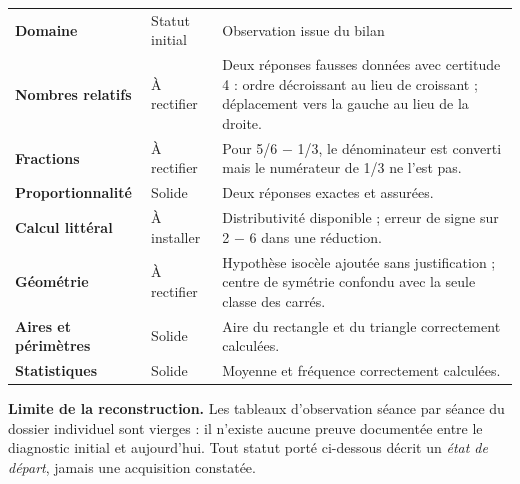 \documentclass[10pt,a4paper]{article}
\begin{document}
\par\noindent\begin{tabularx}{\linewidth}{>{\bfseries}p{32mm} p{28mm} X}
\rowcolor{Navy}\color{white}Domaine & \color{white}Statut initial & \color{white}Observation issue du bilan \\
Nombres relatifs & À rectifier & Deux réponses fausses données avec certitude 4 : ordre décroissant au lieu de croissant ; déplacement vers la gauche au lieu de la droite. \\
Fractions & À rectifier & Pour 5/6 $-$ 1/3, le dénominateur est converti mais le numérateur de 1/3 ne l'est pas. \\
Proportionnalité & Solide & Deux réponses exactes et assurées. \\
Calcul littéral & À installer & Distributivité disponible ; erreur de signe sur 2 $-$ 6 dans une réduction. \\
Géométrie & À rectifier & Hypothèse isocèle ajoutée sans justification ; centre de symétrie confondu avec la seule classe des carrés. \\
Aires et périmètres & Solide & Aire du rectangle et du triangle correctement calculées. \\
Statistiques & Solide & Moyenne et fréquence correctement calculées. \\
\end{tabularx}
\begin{warningbox}\textbf{Limite de la reconstruction.} Les tableaux d'observation séance par séance du dossier individuel sont vierges : il n'existe aucune preuve documentée entre le diagnostic initial et aujourd'hui. Tout statut porté ci-dessous décrit un \emph{état de départ}, jamais une acquisition constatée.\end{warningbox}
\newpage{}
\end{document}
